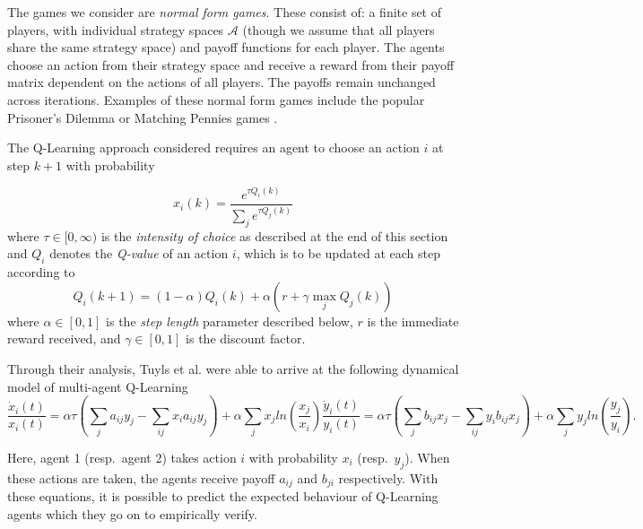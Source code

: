 \documentclass[sigconf,anonymous]{aamas}
\begin{document}
The games we consider are \textit{normal form games}. These consist of: a finite set of players, with individual strategy spaces $\mathcal{A}$ (though we assume that all players share the same strategy space) and payoff functions for each player. The agents choose an action from their strategy space and receive a reward from their payoff matrix dependent on the actions of all players. The payoffs remain unchanged across iterations. Examples of these normal form games include the popular Prisoner's Dilemma or Matching Pennies games \cite{Tuyls2006AnGames}.

The Q-Learning approach considered requires
an agent to choose an action $i$ at step $k+1$ with probability

\begin{equation}
    x_i(k) = \frac{e^{\tau Q_i(k)}}{\sum_j e^{\tau Q_j(k)}}
\end{equation}
%
where $\tau \in [0, \infty)$ is the \textit{intensity of choice} as described at the end of this section and $Q_i$ denotes the \textit{Q-value} of an action $i$, which is to be updated at each step according to
%
\begin{equation}
\label{eqn::Qupdate}
    Q_i(k+1) = (1 - \alpha) Q_i(k) + \alpha (r + \gamma \max_j Q_j(k))
\end{equation}
%
where $\alpha \in [0, 1]$ is the \textit{step length} parameter described below, $r$ is the immediate reward received, and $\gamma \in [0, 1]$ is the discount factor.

Through their analysis, Tuyls et al. were able to
arrive at the following dynamical model of multi-agent Q-Learning
%
\begin{subequations}
\label{eqn::EOM}
    \begin{equation}
        \frac{\dot{x}_i(t)}{x_i(t)} = \alpha \tau (\sum_{j} a_{ij} y_j - \sum_{i j} x_i a_{ij} y_j)
        + \alpha \sum_j x_j ln(\frac{x_j}{x_i}) 
    \end{equation}
    \begin{equation}
        \frac{\dot{y}_i(t)}{y_i(t)} = \alpha \tau (\sum_{j} b_{ij} x_j - \sum_{i j} y_i b_{ij} x_j)
        + \alpha \sum_j y_j ln(\frac{y_j}{y_i}).
    \end{equation}
\end{subequations}

Here,
agent 1 (resp.~agent 2) takes action $i$ with probability
$x_i$ (resp.~$y_j$).
When these actions are taken, the agents
receive payoff $a_{ij}$ and $b_{ji}$ respectively. With these equations, it is possible to
predict the expected behaviour of Q-Learning agents which they go on to empirically verify.
\end{document}
